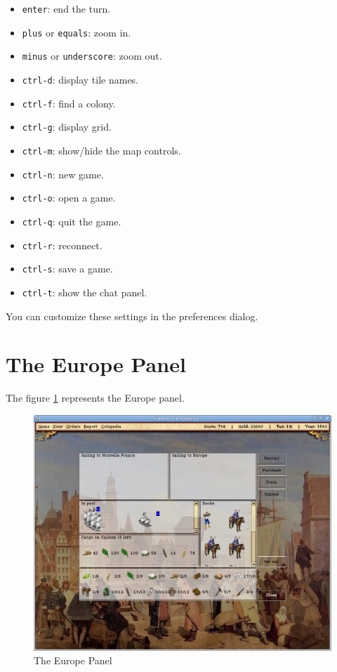 \documentclass[12pt]{book}
\begin{document}
\begin{itemize}
\item\verb$enter$: end the turn.
\item\verb$plus$ or \verb$equals$: zoom in.
\item\verb$minus$ or \verb$underscore$: zoom out.
\item\verb$ctrl-d$: display tile names.
\item\verb$ctrl-f$: find a colony.
\item\verb$ctrl-g$: display grid.
\item\verb$ctrl-m$: show/hide the map controls.
\item\verb$ctrl-n$: new game.
\item\verb$ctrl-o$: open a game.
\item\verb$ctrl-q$: quit the game.
\item\verb$ctrl-r$: reconnect.
\item\verb$ctrl-s$: save a game.
\item\verb$ctrl-t$: show the chat panel.
\end{itemize}

You can customize these settings in the preferences dialog.


\hypertarget{europe panel}{\section{The Europe Panel}}

The figure \ref{europe_panel_fig} represents the Europe panel.
\begin{figure}[htb]
  \begin{center}
    \includegraphics[scale=0.35]{images/europe_panel.png}
    \caption{The Europe Panel\label{europe_panel_fig}}
  \end{center}
\end{figure}
\end{document}
